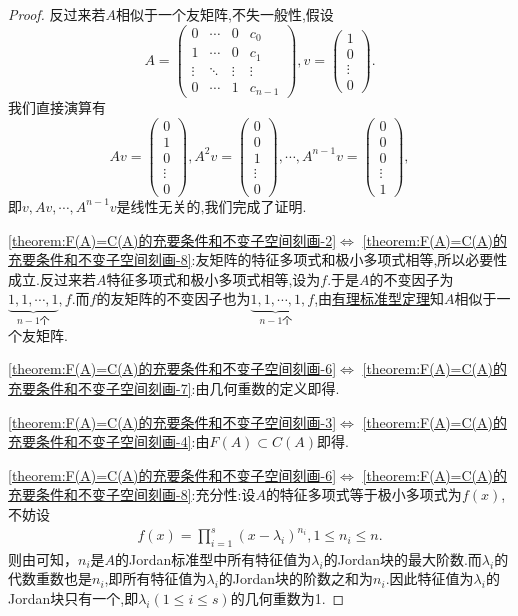 \documentclass[../../main.tex]{subfiles}%
\begin{document}
\begin{proof}
反过来若$A$相似于一个友矩阵,不失一般性,假设
$$A=\begin{pmatrix}0&\cdots&0&c_0\\1&\cdots&0&c_1\\\vdots&\ddots&\vdots&\vdots\\0&\cdots&1&c_{n-1}\end{pmatrix},v=\begin{pmatrix}1\\0\\\vdots\\0\end{pmatrix}.$$
我们直接演算有
$$Av=\begin{pmatrix}0\\1\\0\\\vdots\\0\end{pmatrix},A^2v=\begin{pmatrix}0\\0\\1\\\vdots\\0\end{pmatrix},\cdots,A^{n-1}v=\begin{pmatrix}0\\0\\0\\\vdots\\1\end{pmatrix},$$
即$v,Av,\cdots,A^{n-1}v$是线性无关的,我们完成了证明.

\noindent\ref{theorem:F(A)=C(A)的充要条件和不变子空间刻画-2}$\Leftrightarrow$ \ref{theorem:F(A)=C(A)的充要条件和不变子空间刻画-8}:友矩阵的特征多项式和极小多项式相等,所以必要性成立.反过来若$A$特征多项式和极小多项式相等,设为$f$.于是$A$的不变因子为$\underbrace{1,1,\cdots,1}_{n-1\text{个}},f$.而$f$的友矩阵的不变因子也为$\underbrace{1,1,\cdots,1}_{n-1\text{个}},f$,由\hyperref[theorem:有理标准型核心定理]{有理标准型定理}知$A$相似于一个友矩阵.

\noindent\ref{theorem:F(A)=C(A)的充要条件和不变子空间刻画-6}$\Leftrightarrow$ \ref{theorem:F(A)=C(A)的充要条件和不变子空间刻画-7}:由几何重数的定义即得.

\noindent\ref{theorem:F(A)=C(A)的充要条件和不变子空间刻画-3}$\Leftrightarrow$ \ref{theorem:F(A)=C(A)的充要条件和不变子空间刻画-4}:由$F(A)\subset C(A)$即得.

\noindent\ref{theorem:F(A)=C(A)的充要条件和不变子空间刻画-6}$\Leftrightarrow$ \ref{theorem:F(A)=C(A)的充要条件和不变子空间刻画-8}:{\heiti 充分性:}设$A$的特征多项式等于极小多项式为$f\left( x \right)$,不妨设
\begin{align*}
f\left( x \right) =\prod_{i=1}^s{\left( x-\lambda _i \right) ^{n_i}},1\leqslant n_i\leqslant n.
\end{align*}
则由可知，$n_i$是$A$的Jordan标准型中所有特征值为$\lambda _i$的Jordan块的最大阶数.而$\lambda_i$的代数重数也是$n_i$,即所有特征值为$\lambda_i$的Jordan块的阶数之和为$n_i$.因此特征值为$\lambda_i$的Jordan块只有一个,即$\lambda_i(1\leqslant i\leqslant s)$的几何重数为1.


\end{proof}
\end{document}
